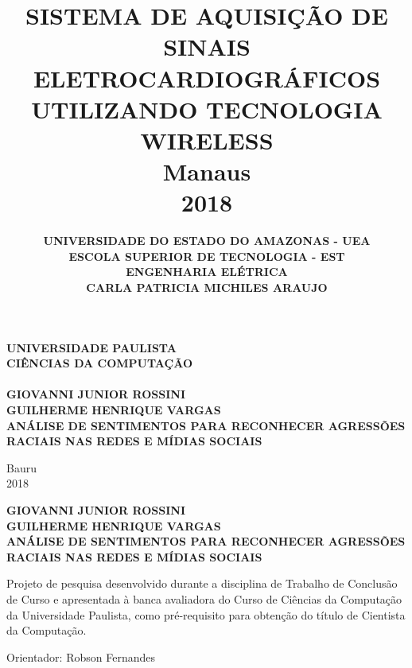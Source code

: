 \documentclass[12pt, a4paper]{article}
\author{ \bf UNIVERSIDADE DO ESTADO DO AMAZONAS - UEA \\[14pt] \small ESCOLA SUPERIOR DE TECNOLOGIA - EST \\[14pt] ENGENHARIA ELÉTRICA \\[96pt] CARLA PATRICIA MICHILES ARAUJO \\[96pt]}
\title{ \rm \bf \Large SISTEMA DE AQUISIÇÃO DE SINAIS ELETROCARDIOGRÁFICOS UTILIZANDO TECNOLOGIA WIRELESS\\[123pt] \rm \small Manaus \\  2018}
\newcommand{\bigsize}{\fontsize{12pt}{20pt}\selectfont}
\begin{document}
\thispagestyle{empty}
\begin{center}
\textbf{ UNIVERSIDADE PAULISTA \\
CIÊNCIAS DA COMPUTAÇÃO \\[50pt] }
\textbf{ \\[70pt] {\bigsize GIOVANNI JUNIOR ROSSINI} \\
GUILHERME HENRIQUE VARGAS\\[120pt] }
\textbf{ {\bigsize ANÁLISE DE SENTIMENTOS PARA RECONHECER AGRESSÕES RACIAIS NAS REDES E MÍDIAS SOCIAIS}  \\[104pt] }
\end{center}
\hspace*{8cm}

\vspace*{\fill}

\begin{center}
Bauru \\ 2018
\end{center}


\newpage
\thispagestyle{empty}
\begin{center}


\textbf{ {\bigsize GIOVANNI JUNIOR ROSSINI} \\
GUILHERME HENRIQUE VARGAS \\[120pt] }
\textbf{ {\bigsize  ANÁLISE DE SENTIMENTOS PARA RECONHECER AGRESSÕES RACIAIS NAS REDES E MÍDIAS SOCIAIS}  \\[50pt] }
\end{center}
\hspace*{8cm}
\begin{flushright}
\begin{minipage}{8cm}
\begin{singlespace}
Projeto de pesquisa desenvolvido durante a disciplina de Trabalho de Conclusão de Curso e apresentada à banca avaliadora do Curso de Ciências da Computação da Universidade Paulista, como pré-requisito para obtenção do título de Cientista da Computação.\\[50pt]
\end{singlespace}
\end{minipage}
\end{flushright}
\begin{center}
Orientador: Robson Fernandes

\end{center}
\end{document}
